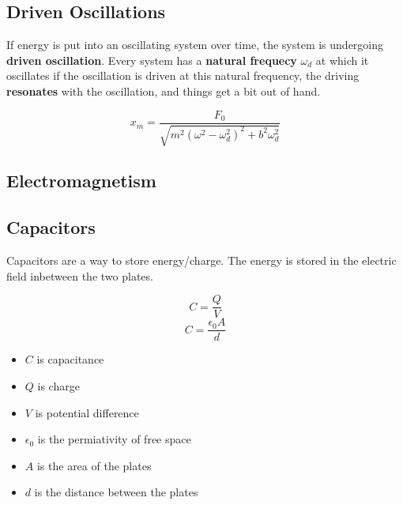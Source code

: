\documentclass{article}
\begin{document}
\subsection{Driven Oscillations}
If energy is put into an oscillating system over time, the system is undergoing \textbf{driven oscillation}. Every system has a \textbf{natural frequecy} $\omega_d$ at which it oscillates if the oscillation is driven at this natural frequency, the driving \textbf{resonates} with the oscillation, and things get a bit out of hand.

\[x_m=\frac{F_0}{\sqrt{m^2\left(\omega^2-\omega_d^2\right)^2+b^2\omega_d^2}}\]

\subsection{Electromagnetism}

\subsection{Capacitors}


Capacitors are a way to store energy/charge. The energy is stored in the electric field inbetween the two plates.

\[C=\frac{Q}{V}\]
\[C=\frac{\epsilon_0A}{d}\]

\begin{itemize}
	\item $C$ is capacitance
	\item $Q$ is charge
	\item $V$ is potential difference
	\item $\epsilon_0$ is the permiativity of free space
	\item $A$ is the area of the plates
	\item $d$ is the distance between the plates
\end{itemize}
\end{document}
